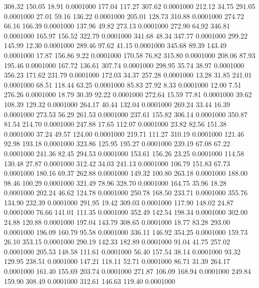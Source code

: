  308.32  150.05   18.91   0.0001000
 177.04  117.27  307.62   0.0001000
 212.12   34.75  291.05   0.0001000
  27.01   59.16  136.22   0.0001000
 205.01  128.73  310.88   0.0001000
 274.72   66.16  166.39   0.0001000
 137.96   49.82  273.13   0.0001000
 272.90   64.92  346.81   0.0001000
 165.97  156.52  322.79   0.0001000
 341.68   48.34  347.77   0.0001000
 299.22  145.99   12.30   0.0001000
 289.46   97.62   41.15   0.0001000
 345.68   89.39  143.49   0.0001000
  17.87  156.86    9.22   0.0001000
 170.58   76.82  315.80   0.0001000
 208.06   87.93  195.46   0.0001000
 167.72  136.61  307.74   0.0001000
 298.95   35.74   38.97   0.0001000
 356.23  171.62  231.79   0.0001000
 172.03   34.37  257.28   0.0001000
  13.28   31.85  241.01   0.0001000
  68.51  118.44   63.25   0.0001000
  85.83   27.92    8.33   0.0001000
  12.00    7.51  276.26   0.0001000
  18.79   30.39   92.22   0.0001000
 272.64   15.59   77.81   0.0001000
  39.62  108.39  129.32   0.0001000
 264.17   40.44  132.04   0.0001000
 269.24   33.44   16.39   0.0001000
 273.53   56.29  261.53   0.0001000
 237.61  155.82  306.14   0.0001000
 350.87   81.54  214.70   0.0001000
 247.88   17.65  112.07   0.0001000
  23.82   82.56  151.38   0.0001000
  37.24   49.57  124.00   0.0001000
 219.71  111.27  310.19   0.0001000
 121.46   92.98  193.18   0.0001000
 323.86  125.95  195.27   0.0001000
 239.19   67.08   67.22   0.0001000
 241.36   82.45  294.53   0.0001000
 153.61  156.26   23.25   0.0001000
 114.58  130.48   27.87   0.0001000
 312.42   34.03  241.13   0.0001000
 106.79  151.83   67.73   0.0001000
 180.16   69.37  262.88   0.0001000
 149.32  100.80  263.18   0.0001000
 188.00   98.46  100.29   0.0001000
 321.49   78.96  328.70   0.0001000
 164.75   35.96   18.28   0.0001000
 202.24   46.62  124.78   0.0001000
 250.78  168.50  233.71   0.0001000
 355.76  134.90  232.39   0.0001000
 291.95   19.42  309.03   0.0001000
 117.90  148.02   24.87   0.0001000
  76.66  141.01  111.35   0.0001000
 352.49  142.54  198.34   0.0001000
 302.00   24.88  120.88   0.0001000
 197.04  143.79  308.65   0.0001000
  18.77   83.28  293.00   0.0001000
 196.09  160.79   95.58   0.0001000
 336.11  146.92  354.25   0.0001000
 159.73   26.10  353.15   0.0001000
 290.19  142.33  182.89   0.0001000
  91.04   41.75  257.02   0.0001000
 205.53  148.58  111.61   0.0001000
  56.40  157.54   38.14   0.0001000
  93.32  129.95  238.51   0.0001000
 147.21  118.11   52.71   0.0001000
  86.71   31.39  264.17   0.0001000
 161.40  155.69  203.74   0.0001000
 271.87  106.09  168.94   0.0001000
 249.84  159.90  308.49   0.0001000
 312.61  146.63  119.40   0.0001000

